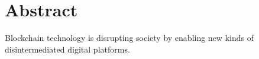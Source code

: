 \chapter*{Abstract}


Blockchain technology is disrupting society by enabling new kinds of disintermediated
digital platforms. 



